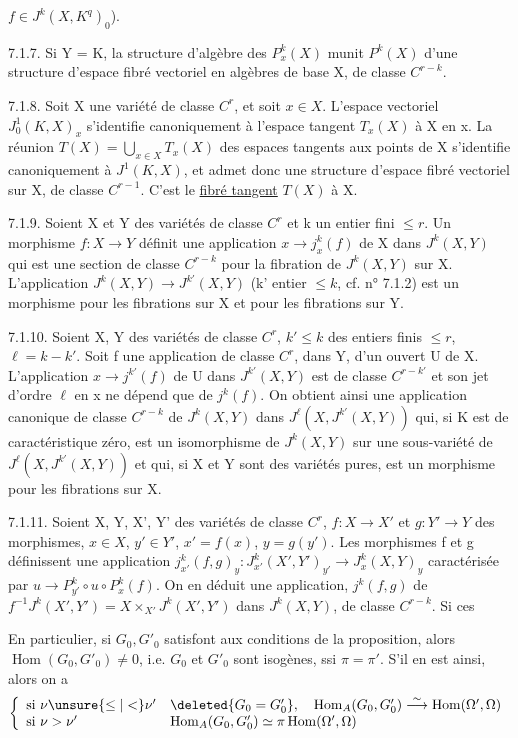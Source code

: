 $f\in J^k(X,K^q)_0$).

7.1.7. Si Y = K, la structure d'algèbre des $P_x^k(X)$ munit $P^k(X)$ d'une structure d'espace fibré vectoriel en algèbres de base X, de classe $C^{r-k}$.

7.1.8. Soit X une variété de classe $C^r$, et soit $x\in X$. L'espace vectoriel $J_0^1(K,X)_x$ s'identifie canoniquement à l'espace tangent $T_x(X)$ à X en x. La réunion $T(X)=\bigcup_{x\in X}T_x(X)$ des espaces tangents aux points de X s'identifie canoniquement à $J^1(K,X)$, et admet donc une structure d'espace fibré vectoriel sur X, de classe $C^{r-1}$. C'est le \uline{fibré tangent} $T(X)$ à X.

7.1.9. Soient X et Y des variétés de classe $C^r$ et k un entier fini $\leq r$. Un morphisme $f:X\longrightarrow Y$ définit une application $x\longrightarrow j_x^k(f)$ de X dans $J^k(X,Y)$ qui est une section de classe $C^{r-k}$ pour la fibration de $J^k(X,Y)$ sur X. L'application $J^k(X,Y)\longrightarrow J^{k'}(X,Y)$ (k' entier $\leq k$, cf. n° 7.1.2) est un morphisme pour les fibrations sur X et pour les fibrations sur Y.

7.1.10. Soient X, Y des variétés de classe $C^r$, $k'\leq k$ des entiers finis $\leq r$, $\ell=k-k'$. Soit f une application de classe $C^r$, dans Y, d'un ouvert U de X. L'application $x\longrightarrow j^{k'}(f)$ de U dans $J^{k'}(X,Y)$ est de classe $C^{r-k'}$ et son jet d'ordre $\ell$ en x ne dépend que de $j^k(f)$. On obtient ainsi une application canonique de classe $C^{r-k}$ de $J^k(X,Y)$ dans $J^\ell(X,J^{k'}(X,Y))$ qui, si K est de caractéristique zéro, est un isomorphisme de $J^k(X,Y)$ sur une sous-variété de $J^\ell(X,J^{k'}(X,Y))$ et qui, si X et Y sont des variétés pures, est un morphisme pour les fibrations sur X.

7.1.11. Soient X, Y, X', Y' des variétés de classe $C^r$, $f:X\longrightarrow X'$ et $g:Y'\longrightarrow Y$ des morphismes, $x\in X$, $y'\in Y'$, $x'=f(x)$, $y=g(y')$. Les morphismes f et g définissent une application $j_{x'}^k(f,g)_y:J_{x'}^k(X',Y')_{y'}\longrightarrow J_x^k(X,Y)_y$ caractérisée par $u\longrightarrow P_{y'}^k\circ u\circ P_x^k(f)$. On en déduit une application, $j^k(f,g)$ de $f^{-1}J^k(X',Y')=X\times_{X'}J^k(X',Y')$ dans $J^k(X,Y)$, de classe $C^{r-k}$. Si ces

En particulier, si $G_0,G'_0$ satisfont aux conditions de la proposition, alors $\operatorname{Hom}(G_0,G'_0)\ne0$, i.e. $G_0$ et $G'_0$ sont isogènes, ssi $\pi=\pi'$.  S'il en est ainsi, alors  on a
\[
\left\{\begin{array}{ll}
\text{si }\nu\unsure{\leq|<}\nu'&\deleted{G_0=G'_0},\quad\operatorname{Hom}_A(G_0,G'_0)\overset\sim\longrightarrow\operatorname{Hom}(\Omega',\Omega)\\
\text{si }\nu>\nu'&\operatorname{Hom}_A(G_0,G'_0)\simeq\pi\operatorname{Hom}(\Omega',\Omega)
\end{array}\right.
\]

